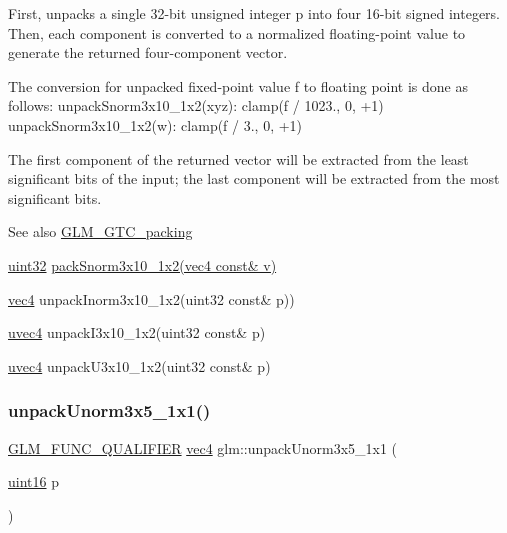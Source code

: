 First, unpacks a single 32-\/bit unsigned integer p into four 16-\/bit signed integers. Then, each component is converted to a normalized floating-\/point value to generate the returned four-\/component vector.

The conversion for unpacked fixed-\/point value f to floating point is done as follows\+: unpack\+Snorm3x10\+\_\+1x2(xyz)\+: clamp(f / 1023., 0, +1) unpack\+Snorm3x10\+\_\+1x2(w)\+: clamp(f / 3., 0, +1)

The first component of the returned vector will be extracted from the least significant bits of the input; the last component will be extracted from the most significant bits.

\begin{DoxySeeAlso}{See also}
\hyperlink{group__gtc__packing}{G\+L\+M\+\_\+\+G\+T\+C\+\_\+packing} 

\hyperlink{group__gtc__type__precision_ga202b6a53c105fcb7e531f9b443518451}{uint32} \hyperlink{group__gtc__packing_ga0d4157cec37c0312216a7be1cc92df54}{pack\+Snorm3x10\+\_\+1x2(vec4 const\& v)} 

\hyperlink{group__core__types_ga5881b1b022d7fd1b7218f5916532dd02}{vec4} unpack\+Inorm3x10\+\_\+1x2(uint32 const\& p)) 

\hyperlink{group__core__types_ga1c426d19627b32b14f0089f7f4ba7b1d}{uvec4} unpack\+I3x10\+\_\+1x2(uint32 const\& p) 

\hyperlink{group__core__types_ga1c426d19627b32b14f0089f7f4ba7b1d}{uvec4} unpack\+U3x10\+\_\+1x2(uint32 const\& p) 
\end{DoxySeeAlso}
\mbox{\label{group__gtc__packing_gaab3b476e8f320670717fd518f350ce28}} 
\subsubsection{\texorpdfstring{unpack\+Unorm3x5\+\_\+1x1()}{unpackUnorm3x5\_1x1()}}
{\footnotesize\ttfamily \hyperlink{setup_8hpp_a33fdea6f91c5f834105f7415e2a64407}{G\+L\+M\+\_\+\+F\+U\+N\+C\+\_\+\+Q\+U\+A\+L\+I\+F\+I\+ER} \hyperlink{group__core__types_ga5881b1b022d7fd1b7218f5916532dd02}{vec4} glm\+::unpack\+Unorm3x5\+\_\+1x1 (\begin{DoxyParamCaption}\item[{\hyperlink{group__gtc__type__precision_gad8c2939e1fdd8e5828b31d95c52255d5}{uint16}}]{p }\end{DoxyParamCaption})}

